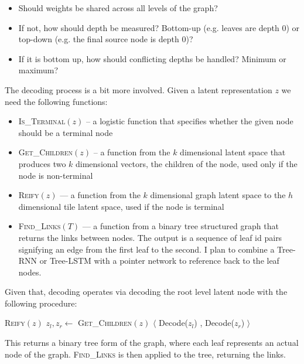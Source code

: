 \documentclass[a4paper]{article}
\begin{document}
\begin{itemize}
\item Should weights be shared across all levels of the graph?
\item If not, how should depth be measured? Bottom-up (e.g. leaves are depth 0) or top-down (e.g. the final source node is depth 0)? 
\item If it is bottom up, how should conflicting depths be handled? Minimum or maximum?
\end{itemize}

The decoding process is a bit more involved.  Given a latent representation $z$ we need the following functions:

\begin{itemize}
\item \textsc{Is\_Terminal}$(z)$ -- a logistic function that specifies whether the given node should be a terminal node
\item \textsc{Get\_Children}$(z)$ -- a function from the $k$ dimensional latent space that produces two $k$ dimensional vectors, the children of the node, used only if the node is non-terminal
\item \textsc{Reify}$(z)$ --- a function from the $k$ dimensional graph latent space to the $h$ dimensional tile latent space, used if the node is terminal

\item \textsc{Find\_Links}$(T)$ --- a function from a binary tree structured graph that returns the links between nodes.  The output is a sequence of leaf id pairs signifying an edge from the first leaf to the second. I plan to combine a Tree-RNN or Tree-LSTM \cite{treernn,treelstm} with a pointer network \cite{pointernetwork} to reference back to the leaf nodes.
\end{itemize}


Given that, decoding operates via decoding the root level latent node with the following procedure:


\begin{algorithmic}[1]
\State \Return \textsc{Reify}$(z)$
\Else 
\State $z_{l}, z_{r} \gets $  \textsc{Get\_Children}$(z)$
\State \Return $\langle$ Decode($z_l$) ,  Decode($z_r$) $\rangle$ 
\EndIf
\EndProcedure
\end{algorithmic}

This returns a binary tree form of the graph, where each leaf represents an actual node of the graph.   \textsc{Find\_Links} is then applied to the tree, returning the links.
\end{document}
